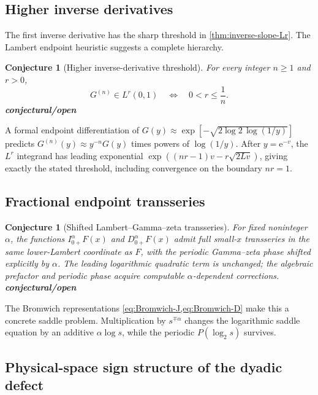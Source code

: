 \documentclass[11pt]{article}
\newcommand{\statusopen}{\textcolor{statusred}{\textbf{conjectural/open}}}
\newtheorem{conjecture}[theorem]{Conjecture}
\theoremstyle{definition}
\theoremstyle{remark}
\newcommand{\e}{\mathrm e}
\begin{document}
\subsection{Higher inverse derivatives}

The first inverse derivative has the sharp threshold in \cref{thm:inverse-slope-Lr}.  The
Lambert endpoint heuristic suggests a complete hierarchy.

\begin{conjecture}[Higher inverse-derivative threshold]
\label{conj:higher-G-derivatives}
For every integer $n\ge1$ and $r>0$,
\begin{equation}
 G^{(n)}\in L^r(0,1)
 \quad\Longleftrightarrow\quad
 0<r\le\frac1n.
 \label{eq:conj-higher-G}
\end{equation}
\statusopen
\end{conjecture}

A formal endpoint differentiation of
$G(y)\approx\exp[-\sqrt{2\log2\,\log(1/y)}]$ predicts
$G^{(n)}(y)\approx y^{-n}G(y)$ times powers of $\log(1/y)$.  After $y=\e^{-v}$, the $L^r$
integrand has leading exponential $\exp((nr-1)v-r\sqrt{2Lv})$, giving exactly the stated
threshold, including convergence on the boundary $nr=1$.

\subsection{Fractional endpoint transseries}

\begin{conjecture}[Shifted Lambert--Gamma--zeta transseries]
\label{conj:fractional-transseries}
For fixed noninteger $\alpha$, the functions
$I_{0+}^{\alpha}F(x)$ and $D_{0+}^{\alpha}F(x)$ admit full small-$x$ transseries in the same
lower-Lambert coordinate as $F$, with the periodic Gamma--zeta phase shifted explicitly by
$\alpha$.  The leading logarithmic quadratic term is unchanged; the algebraic prefactor and
periodic phase acquire computable $\alpha$-dependent corrections.
\statusopen
\end{conjecture}

The Bromwich representations \cref{eq:Bromwich-J,eq:Bromwich-D} make this a concrete saddle
problem.  Multiplication by $s^{\mp\alpha}$ changes the logarithmic saddle equation by an
additive $\alpha\log s$, while the periodic $P(\log_2s)$ survives.

\subsection{Physical-space sign structure of the dyadic defect}
\end{document}
